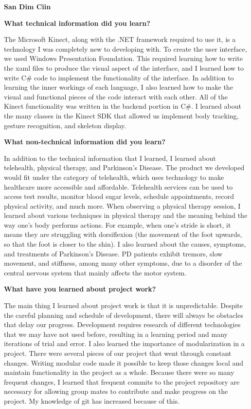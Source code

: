 \documentclass[onecolumn, draftclsnofoot,10pt, compsoc]{IEEEtran}
\begin{document}
\begin{flushleft}
{\large\textbf{San Dim Ciin}\par}
\textbf{What technical information did you learn?}\par
The Microsoft Kinect, along with the .NET framework required to use it, is a technology I was completely new to developing with. To create the user interface, we used Windows Presentation Foundation. This required learning how to write the xaml files to produce the visual aspect of the interface, and I learned how to write C\# code to implement the functionality of the interface. In addition to learning the inner workings of each language, I also learned how to make the visual and functional pieces of the code interact with each other. All of the Kinect functionality was written in the backend portion in C\#. I learned about the many classes in the Kinect SDK that allowed us implement body tracking, gesture recognition, and skeleton display.

\textbf{What non-technical information did you learn?}\par
In addition to the technical information that I learned, I learned about telehealth, physical therapy, and Parkinson's Disease. The product we developed would fit under the category of telehealth, which uses technology to make healthcare more accessible and affordable. Telehealth services can be used to access test results, monitor blood sugar levels, schedule appointments, record physical activity, and much more. When observing a physical therapy session, I learned about various techniques in physical therapy and the meaning behind the way one's body performs actions. For example, when one's stride is short, it means they are struggling with dorsiflexion (the movement of the foot upwards, so that the foot is closer to the shin). I also learned about the causes, symptoms, and treatments of Parkinson's Disease. PD patients exhibit tremors, slow movement, and stiffness, among many other symptoms, due to a disorder of the central nervous system that mainly affects the motor system. 

\textbf{What have you learned about project work?}\par
The main thing I learned about project work is that it is unpredictable. Despite the careful planning and schedule of development, there will always be obstacles that delay our progress. Development requires research of different technologies that we may have not used before, resulting in a learning period and many iterations of trial and error. I also learned the importance of modularization in a project. There were several pieces of our project that went through constant changes. Writing modular code made it possible to keep those changes local and maintain functionality in the project as a whole. Because there were so many frequent changes, I learned that frequent commits to the project repository are necessary for allowing group mates to contribute and make progress on the project. My knowledge of git has increased because of this.


\end{flushleft}
\end{document}
